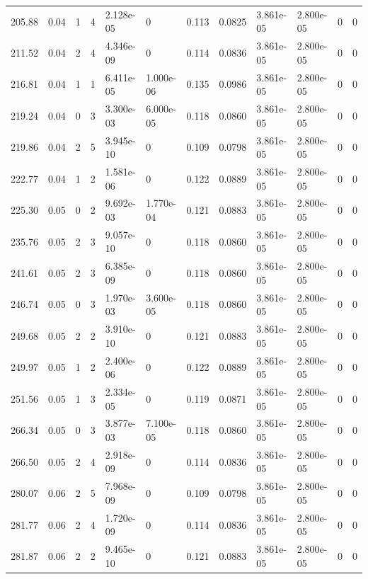 \documentclass[preview]{standalone}
\begin{document}
{{{\begin{tabular}{L{1.2cm}C{1.2cm} C{0.3cm}C{0.5cm} C{1.4cm}C{1.4cm} C{1.4cm}C{1.4cm} C{1.6cm}C{1.6cm} C{1.6cm}C{1.6cm}}
  205.88  &  0.04  & 1     &  4 &  2.128e-05  & 0  &  0.113&   0.0825& 3.861e-05 & 2.800e-05   &  0 & 0  \\ 
  211.52  &  0.04  & 2     &  4 &  4.346e-09  & 0  &  0.114&   0.0836& 3.861e-05 & 2.800e-05   &  0 & 0  \\ 
  216.81  &  0.04  & 1     &  1 &  6.411e-05  & 1.000e-06  &  0.135&   0.0986& 3.861e-05 & 2.800e-05   &  0 & 0  \\ 
  219.24  &  0.04  & 0     &  3 &  3.300e-03  & 6.000e-05  &  0.118&   0.0860& 3.861e-05 & 2.800e-05   &  0 & 0  \\ 
  219.86  &  0.04  & 2     &  5 &  3.945e-10  & 0  &  0.109&   0.0798& 3.861e-05 & 2.800e-05   &  0 & 0  \\ 
  222.77  &  0.04  & 1     &  2 &  1.581e-06  & 0  &  0.122&   0.0889& 3.861e-05 & 2.800e-05   &  0 & 0  \\ 
  225.30  &  0.05  & 0     &  2 &  9.692e-03  & 1.770e-04  &  0.121&   0.0883& 3.861e-05 & 2.800e-05   &  0 & 0  \\ 
  235.76  &  0.05  & 2     &  3 &  9.057e-10  & 0  &  0.118&   0.0860& 3.861e-05 & 2.800e-05   &  0 & 0  \\ 
  241.61  &  0.05  & 2     &  3 &  6.385e-09  & 0  &  0.118&   0.0860& 3.861e-05 & 2.800e-05   &  0 & 0  \\ 
  246.74  &  0.05  & 0     &  3 &  1.970e-03  & 3.600e-05  &  0.118&   0.0860& 3.861e-05 & 2.800e-05   &  0 & 0  \\ 
  249.68  &  0.05  & 2     &  2 &  3.910e-10  & 0  &  0.121&   0.0883& 3.861e-05 & 2.800e-05   &  0 & 0  \\ 
  249.97  &  0.05  & 1     &  2 &  2.400e-06  & 0  &  0.122&   0.0889& 3.861e-05 & 2.800e-05   &  0 & 0  \\ 
  251.56  &  0.05  & 1     &  3 &  2.334e-05  & 0  &  0.119&   0.0871& 3.861e-05 & 2.800e-05   &  0 & 0  \\ 
  266.34  &  0.05  & 0     &  3 &  3.877e-03  & 7.100e-05  &  0.118&   0.0860& 3.861e-05 & 2.800e-05   &  0 & 0  \\ 
  266.50  &  0.05  & 2     &  4 &  2.918e-09  & 0  &  0.114&   0.0836& 3.861e-05 & 2.800e-05   &  0 & 0  \\ 
  280.07  &  0.06  & 2     &  5 &  7.968e-09  & 0  &  0.109&   0.0798& 3.861e-05 & 2.800e-05   &  0 & 0  \\ 
  281.77  &  0.06  & 2     &  4 &  1.720e-09  & 0  &  0.114&   0.0836& 3.861e-05 & 2.800e-05   &  0 & 0  \\ 
  281.87  &  0.06  & 2     &  2 &  9.465e-10  & 0  &  0.121&   0.0883& 3.861e-05 & 2.800e-05   &  0 & 0  \\ 

\end{tabular}}}}
\end{document}
